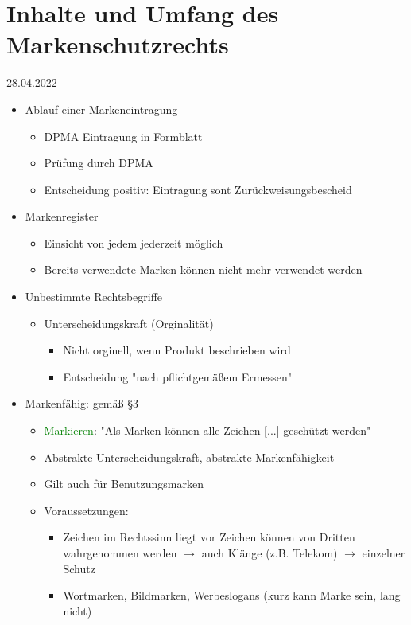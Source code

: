 \documentclass{report}
\begin{document}
\section{Inhalte und Umfang des Markenschutzrechts}
28.04.2022
\begin{itemize}
	\item Ablauf einer Markeneintragung
	\begin{itemize}
		\item DPMA Eintragung in Formblatt
		\item Prüfung durch DPMA
		\item Entscheidung positiv: Eintragung
		\newline sont Zurückweisungsbescheid
	\end{itemize}
	\item Markenregister
	\begin{itemize}
		\item Einsicht von jedem jederzeit möglich
		\item Bereits verwendete Marken können nicht mehr verwendet werden
	\end{itemize}
	\item Unbestimmte Rechtsbegriffe
	\begin{itemize}
		\item Unterscheidungskraft (Orginalität)
		\begin{itemize}
			\item Nicht orginell, wenn Produkt beschrieben wird
			\item Entscheidung "nach pflichtgemäßem Ermessen"
		\end{itemize}
	\end{itemize}
	\item Markenfähig: gemäß §3
	\begin{itemize}
		\item \textcolor{green}{Markieren}: "Als Marken können alle Zeichen [...] geschützt werden"
		\item Abstrakte Unterscheidungskraft, abstrakte Markenfähigkeit
		\item Gilt auch für Benutzungsmarken
		\item Voraussetzungen:
		\begin{itemize}
			\item Zeichen im Rechtssinn liegt vor
			\newline Zeichen können von Dritten wahrgenommen werden $\rightarrow$ auch Klänge (z.B. Telekom) $\rightarrow$ einzelner Schutz
			\item Wortmarken, Bildmarken, Werbeslogans (kurz kann Marke sein, lang nicht)

\end{itemize}
\end{itemize}
\end{itemize}
\end{document}
